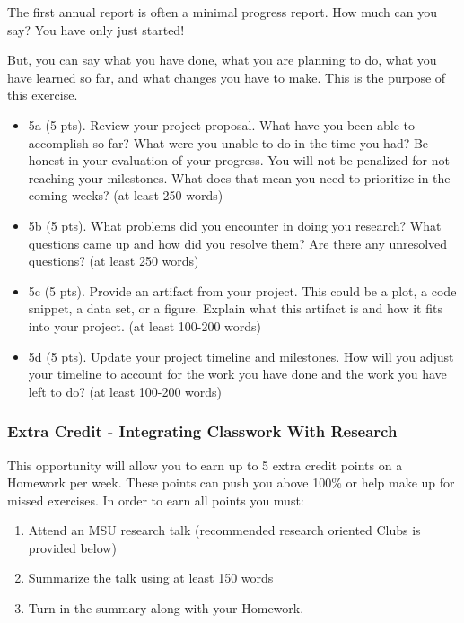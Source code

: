 \documentclass[11pt]{article}
\providecommand{\tightlist}{%
      \setlength{\itemsep}{0pt}\setlength{\parskip}{0pt}}
\begin{document}
The first annual report is often a minimal progress report. How much can
you say? You have only just started!

But, you can say what you have done, what you are planning to do, what
you have learned so far, and what changes you have to make. This is the
purpose of this exercise.

\begin{itemize}
\tightlist
\item
  5a (5 pts). Review your project proposal. What have you been able to
  accomplish so far? What were you unable to do in the time you had? Be
  honest in your evaluation of your progress. You will not be penalized
  for not reaching your milestones. What does that mean you need to
  prioritize in the coming weeks? (at least 250 words)
\item
  5b (5 pts). What problems did you encounter in doing you research?
  What questions came up and how did you resolve them? Are there any
  unresolved questions? (at least 250 words)
\item
  5c (5 pts). Provide an artifact from your project. This could be a
  plot, a code snippet, a data set, or a figure. Explain what this
  artifact is and how it fits into your project. (at least 100-200
  words)
\item
  5d (5 pts). Update your project timeline and milestones. How will you
  adjust your timeline to account for the work you have done and the
  work you have left to do? (at least 100-200 words)
\end{itemize}

    \subsubsection{Extra Credit - Integrating Classwork With
Research}\label{extra-credit---integrating-classwork-with-research}

This opportunity will allow you to earn up to 5 extra credit points on a
Homework per week. These points can push you above 100\% or help make up
for missed exercises. In order to earn all points you must:

\begin{enumerate}
\def\labelenumi{\arabic{enumi}.}
\item
  Attend an MSU research talk (recommended research oriented Clubs is
  provided below)
\item
  Summarize the talk using at least 150 words
\item
  Turn in the summary along with your Homework.
\end{enumerate}
\end{document}
